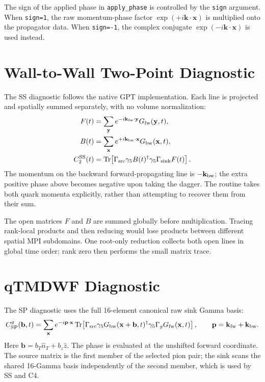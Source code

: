 \documentclass[11pt,a4paper]{article}
\newcommand{\Gfive}{\gamma_{5}}
\newcommand{\walltag}[1]{\texttt{#1}}
\begin{document}
The sign of the applied phase in \walltag{apply\_phase} is controlled by the
\walltag{sign} argument.  When \walltag{sign=1}, the raw momentum-phase factor
$\exp(+i\mathbf{k}\!\cdot\!\mathbf{x})$ is multiplied onto the propagator data.
When \walltag{sign=-1}, the complex conjugate $\exp(-i\mathbf{k}\!\cdot\!\mathbf{x})$
is used instead.


\section{Wall-to-Wall Two-Point Diagnostic}

The SS diagnostic follows the native GPT implementation. Each line is projected
and spatially summed separately, with no volume normalization:
\begin{align}
F(t) &= \sum_{\mathbf y} e^{-i\mathbf k_{\rm fw}\cdot\mathbf y}
                  G_{\rm fw}(\mathbf y,t),\\
B(t) &= \sum_{\mathbf x} e^{+i\mathbf k_{\rm bw}\cdot\mathbf x}
                  G_{\rm bw}(\mathbf x,t),\\
C_{2}^{\rm SS}(t)
 &= \Tr\!\left[\Gamma_{\rm src}\Gfive B(t)^\dagger\Gfive
                     \Gamma_{\rm sink}F(t)\right].\label{eq:C2}
\end{align}
The momentum on the backward forward-propagating line is
$-\mathbf k_{\rm bw}$; the extra positive phase above becomes negative upon
taking the dagger. The routine takes both quark momenta explicitly, rather
than attempting to recover them from their sum.

The open matrices $F$ and $B$ are summed globally before multiplication.
Tracing rank-local products and then reducing would lose products between
different spatial MPI subdomains. One root-only reduction collects both open
lines in global time order; rank zero then performs the small matrix trace.

\section{qTMDWF Diagnostic}

The SP diagnostic uses the full 16-element canonical raw sink Gamma basis:
\begin{equation}\label{eq:tmdwf}
C_{\rm SP}^{g}(\mathbf b,t)=
 \sum_{\mathbf x}e^{-i\mathbf p\cdot\mathbf x}
 \Tr\!\left[\Gamma_{\rm src}\Gfive
     G_{\rm bw}(\mathbf x+\mathbf b,t)^\dagger\Gfive
     \Gamma_g G_{\rm fw}(\mathbf x,t)\right],
\qquad \mathbf p=\mathbf k_{\rm fw}+\mathbf k_{\rm bw}.
\end{equation}
Here $\mathbf b=b_T\hat n_T+b_z\hat z$. The phase is evaluated at the
unshifted forward coordinate. The source matrix is the first member of the
selected pion pair; the sink scans the shared 16-Gamma basis independently
of the second member, which is used by SS and C4.
\end{document}

